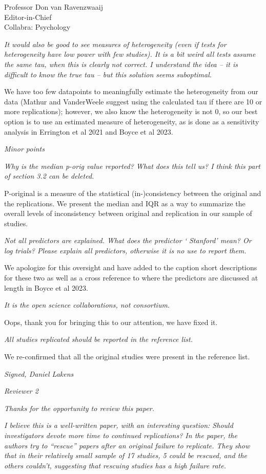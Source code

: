 \documentclass{stanfordletter}
\newcommand{\theysaid}[1]{\begin{leftbar} \noindent 
		\textsl{ #1}\end{leftbar}}
\begin{document}
\begin{letter}{Professor Don van Ravenzwaaij \\ Editor-in-Chief \\ Collabra: Psychology }
		 
		 \theysaid{It would also be good to see measures of heterogeneity (even if tests for heterogeneity have low power with few studies). It is a bit weird all tests assume the same tau, when this is clearly not correct. I understand the idea – it is difficult to know the true tau – but this solution seems suboptimal.}
		
		We have too few datapoints to meaningfully estimate the heterogeneity from our data (Mathur and VanderWeele suggest using the calculated tau if there are 10 or more replications); however, we also know the heterogeneity is not 0, so our best option is to use an estimated measure of heterogeneity, as is done as a sensitivity analysis in Errington et al 2021 and Boyce et al 2023. 
		
		\theysaid{Minor points}
		\theysaid{Why is the median p-orig value reported? What does this tell us? I think this part of section 3.2 can be deleted.}
		
		P-original is a measure of the statistical (in-)consistency between the original and the replications. We present the median and IQR as a way to summarize the overall levels of inconsistency between original and replication in our sample of studies. 
		
		\theysaid{Not all predictors are explained. What does the predictor ‘ Stanford’ mean? Or log trials? Please explain all predictors, otherwise it is no use to report them.}
		
		We apologize for this oversight and have added to the caption short descriptions for these two as well as a cross reference to where the predictors are discussed at length in Boyce et al 2023. 
		
		\theysaid{It is the open science collaborations, not consortium.}
		
		Oops, thank you for bringing this to our attention, we have fixed it. 
		
		\theysaid{All studies replicated should be reported in the reference list.}
		We re-confirmed that all the original studies were present in the reference list. 
		
		\theysaid{Signed, Daniel Lakens}
		
		\theysaid{Reviewer 2}
		
		\theysaid{Thanks for the opportunity to review this paper.}
		
		\theysaid{I believe this is a well-written paper, with an interesting question: Should investigators devote more time to continued replications?
		In the paper, the authors try to “rescue” papers after an original failure to replicate. They show that in their relatively small sample of 17 studies, 5 could be rescued, and the others couldn’t, suggesting that rescuing studies has a high failure rate.}
		

\end{letter}
\end{document}
